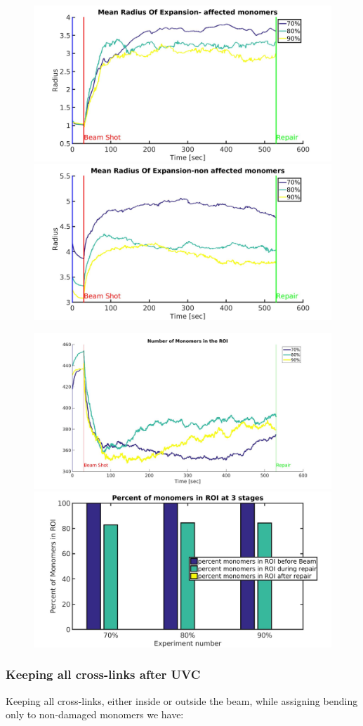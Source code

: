 \documentclass[12pt]{report}
\begin{document}
		\begin{figure}[H]
		\includegraphics[width=0.5\linewidth, height=0.3\textheight]{Images/expandNonDamaged/BreakAffectedCrosslinks/05/meanRadiusOfExpansionAffected}
	    \includegraphics[width=0.5\linewidth,
		height=0.3\textheight]{Images/expandNonDamaged/BreakAffectedCrosslinks/05/meanRadiusOfExpansionNonAffected}
		\caption{}
		\label{fig:meanRadiusOfExpansionBendingNonAffectedBreakDamagedCrosslinks}
		\end{figure}
		
			
		\begin{figure}[H]
		\includegraphics[width=0.5\linewidth, height=0.3\textheight]{Images/expandNonDamaged/BreakAffectedCrosslinks/05/meanNumMonomersInROI}
		\includegraphics[width=0.5\linewidth, height=0.3\textheight]{Images/expandNonDamaged/BreakAffectedCrosslinks/05/percentageOfMonomersInROI}
		\caption{}		
		\label{fig:percentageOfMonomersInROI}
		\end{figure}
		
		
			
	\subsubsection{Keeping all cross-links after UVC}
		Keeping all cross-links, either	inside or outside the beam, while assigning bending only to non-damaged monomers we have:
		
\end{document}
